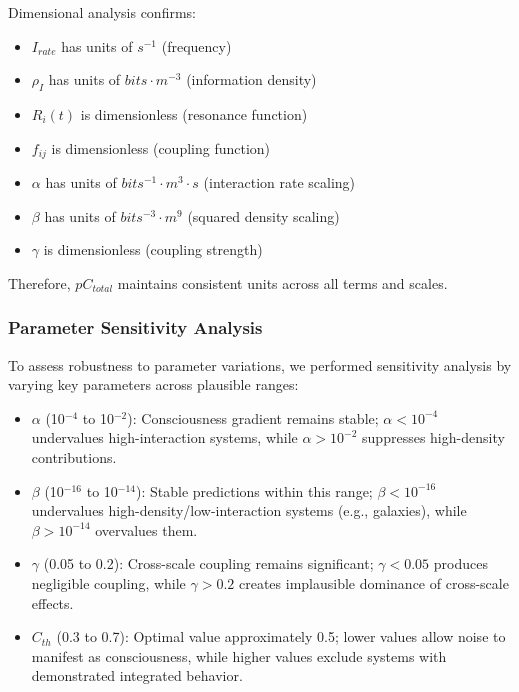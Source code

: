 \documentclass[12pt]{article}
\begin{document}
Dimensional analysis confirms:
\begin{itemize}
    \item $I_{rate}$ has units of $s^{-1}$ (frequency)
    \item $\rho_I$ has units of $bits \cdot m^{-3}$ (information density)
    \item $R_i(t)$ is dimensionless (resonance function)
    \item $f_{ij}$ is dimensionless (coupling function)
    \item $\alpha$ has units of $bits^{-1} \cdot m^3 \cdot s$ (interaction rate scaling)
    \item $\beta$ has units of $bits^{-3} \cdot m^9$ (squared density scaling)
    \item $\gamma$ is dimensionless (coupling strength)
\end{itemize}

Therefore, $pC_{total}$ maintains consistent units across all terms and scales.

\subsubsection{Parameter Sensitivity Analysis}

To assess robustness to parameter variations, we performed sensitivity analysis by varying key parameters across plausible ranges:

\begin{itemize}
    \item $\alpha$ (10$^{-4}$ to 10$^{-2}$): Consciousness gradient remains stable; $\alpha < 10^{-4}$ undervalues high-interaction systems, while $\alpha > 10^{-2}$ suppresses high-density contributions.
    
    \item $\beta$ (10$^{-16}$ to 10$^{-14}$): Stable predictions within this range; $\beta < 10^{-16}$ undervalues high-density/low-interaction systems (e.g., galaxies), while $\beta > 10^{-14}$ overvalues them.
    
    \item $\gamma$ (0.05 to 0.2): Cross-scale coupling remains significant; $\gamma < 0.05$ produces negligible coupling, while $\gamma > 0.2$ creates implausible dominance of cross-scale effects.
    
    \item $C_{th}$ (0.3 to 0.7): Optimal value approximately 0.5; lower values allow noise to manifest as consciousness, while higher values exclude systems with demonstrated integrated behavior.
\end{itemize}
\end{document}

